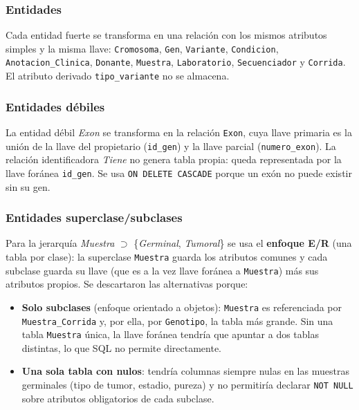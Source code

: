 \documentclass[11pt,a4paper]{article}
\newcommand{\tb}[1]{\texttt{#1}}
\begin{document}
\subsubsection{Entidades}

Cada entidad fuerte se transforma en una relación con los mismos atributos simples y la misma llave: \tb{Cromosoma}, \tb{Gen}, \tb{Variante}, \tb{Condicion}, \tb{Anotacion\_Clinica}, \tb{Donante}, \tb{Muestra}, \tb{Laboratorio}, \tb{Secuenciador} y \tb{Corrida}. El atributo derivado \tb{tipo\_variante} no se almacena.

\subsubsection{Entidades débiles}

La entidad débil \emph{Exon} se transforma en la relación \tb{Exon}, cuya llave primaria es la unión de la llave del propietario (\tb{id\_gen}) y la llave parcial (\tb{numero\_exon}). La relación identificadora \emph{Tiene} no genera tabla propia: queda representada por la llave foránea \tb{id\_gen}. Se usa \tb{ON DELETE CASCADE} porque un exón no puede existir sin su gen.

\subsubsection{Entidades superclase/subclases}

Para la jerarquía \emph{Muestra} $\supset$ \{\emph{Germinal}, \emph{Tumoral}\} se usa el \textbf{enfoque E/R} (una tabla por clase): la superclase \tb{Muestra} guarda los atributos comunes y cada subclase guarda su llave (que es a la vez llave foránea a \tb{Muestra}) más sus atributos propios. Se descartaron las alternativas porque:

\begin{itemize}
  \item \textbf{Solo subclases} (enfoque orientado a objetos): \tb{Muestra} es referenciada por \tb{Muestra\_Corrida} y, por ella, por \tb{Genotipo}, la tabla más grande. Sin una tabla \tb{Muestra} única, la llave foránea tendría que apuntar a dos tablas distintas, lo que SQL no permite directamente.
  \item \textbf{Una sola tabla con nulos}: tendría columnas siempre nulas en las muestras germinales (tipo de tumor, estadio, pureza) y no permitiría declarar \tb{NOT NULL} sobre atributos obligatorios de cada subclase.
\end{itemize}
\end{document}
